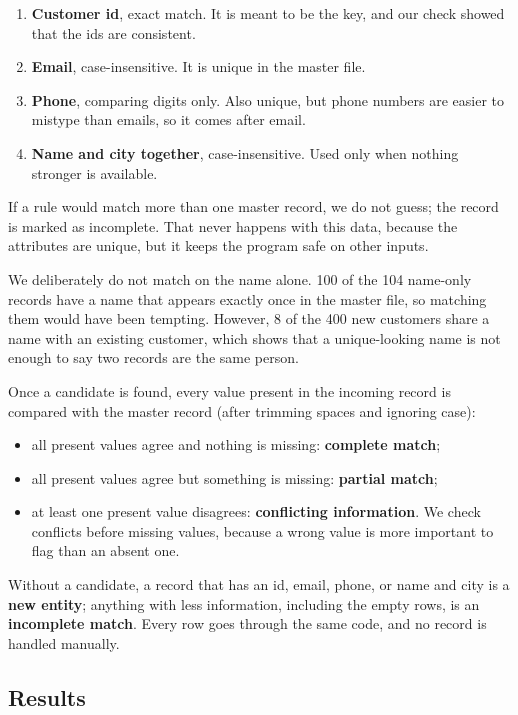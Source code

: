 \documentclass[11pt,a4paper]{article}
\begin{document}
\begin{enumerate}
\item \textbf{Customer id}, exact match. It is meant to be the key, and our
check showed that the ids are consistent.
\item \textbf{Email}, case-insensitive. It is unique in the master file.
\item \textbf{Phone}, comparing digits only. Also unique, but phone numbers
are easier to mistype than emails, so it comes after email.
\item \textbf{Name and city together}, case-insensitive. Used only when
nothing stronger is available.
\end{enumerate}

If a rule would match more than one master record, we do not guess; the
record is marked as incomplete. That never happens with this data, because
the attributes are unique, but it keeps the program safe on other inputs.

We deliberately do not match on the name alone. 100 of the 104 name-only
records have a name that appears exactly once in the master file, so matching
them would have been tempting. However, 8 of the 400 new customers share a
name with an existing customer, which shows that a unique-looking name is not
enough to say two records are the same person.

Once a candidate is found, every value present in the incoming record is
compared with the master record (after trimming spaces and ignoring case):

\begin{itemize}
\item all present values agree and nothing is missing: \textbf{complete match};
\item all present values agree but something is missing: \textbf{partial match};
\item at least one present value disagrees: \textbf{conflicting information}.
We check conflicts before missing values, because a wrong value is more
important to flag than an absent one.
\end{itemize}

Without a candidate, a record that has an id, email, phone, or name and city
is a \textbf{new entity}; anything with less information, including the empty
rows, is an \textbf{incomplete match}. Every row goes through the same code, and
no record is handled manually.

\subsection{Results}
\end{document}
